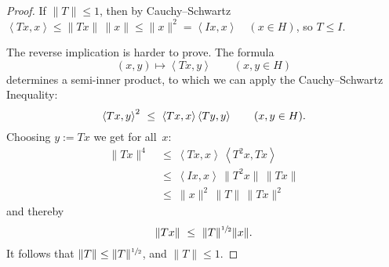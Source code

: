 \documentclass[main.tex]{subfiles}
\begin{document}
\begin{proof}
If $\|T\|\leq 1$,
then by Cauchy--Schwartz 
$\left<Tx,x\right>
\leq \|Tx\|\,\|x\|
\leq\|x\|^2
=\left<Ix,x\right>\quad(x\in H)$,
so $T\leq I$.

The reverse implication is harder to prove.
The formula 
\begin{equation*}
(x,y) \mapsto \left< Tx, y \right>\qquad (x,y\in H)
\end{equation*}
determines a semi-inner product,
to which we can apply the Cauchy--Schwartz Inequality:
\begin{equation*}
\left< Tx, y\right>^2\ \leq\ \left<Tx,x\right>\left<Ty,y\right>
\qquad(x,y\in H)\text{.}
\end{equation*}
Choosing $y:=Tx$ we get for all~$x$:
\begin{align*}
\|Tx\|^4\ &\leq\ \left<Tx, x\right>\,\left< T^2x,Tx\right> \\
          &\leq\ \left<Ix, x\right>\,\|T^2 x\|\,\|Tx\| \\
          &\leq\ \|x\|^2\,\|T\|\,\|Tx\|^2
\end{align*}
and thereby
\begin{equation*}
\|Tx\|\ \leq\ \|T\|^{\sfrac{1}{2}} \|x\|\text{.}
\end{equation*}
It follows that $\|T\|\leq \|T\|^{\sfrac{1}{2}}$,
and $\|T\|\leq 1$. \xqed
\end{proof}
\clearpage
\end{document}
